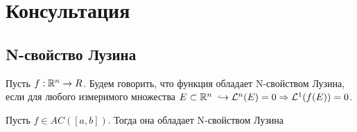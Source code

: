 \section{Консультация}

\subsection{N-свойство Лузина}

\begin{definition}
    Пусть $f: \mathbb{R}^n \rightarrow R$. Будем говорить, что функция обладает N-свойством Лузина, если для любого измеримого множества $E \subset \R^n \ \hookrightarrow \LL^n(E) = 0 \Rightarrow \LL^1(f(E)) = 0$. 
\end{definition}

\begin{theorem}
    Пусть $f \in AC([a, b])$. Тогда она обладает N-свойством Лузина
\end{theorem}

